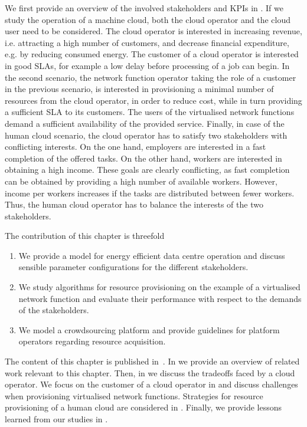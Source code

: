 We first provide an overview of the involved stakeholders and \glspl{KPI} in .
If we study the operation of a machine cloud, both the cloud operator and the cloud user need to be considered.
The cloud operator is interested in increasing revenue, i.e. attracting a high number of customers, and decrease financial expenditure, e.g. by reducing consumed energy.
The customer of a cloud operator is interested in good \glspl{SLA}, for example a low delay before processing of a job can begin.
In the second scenario, the network function operator taking the role of a customer in the previous scenario, is interested in provisioning a minimal number of resources from the cloud operator, in order to reduce cost, while in turn providing a sufficient \gls{SLA} to its customers.
The users of the virtualised network functions demand a sufficient availability of the provided service.
Finally, in case of the human cloud scenario, the cloud operator has to satisfy two stakeholders with conflicting interests.
On the one hand, employers are interested in a fast completion of the offered tasks.
On the other hand, workers are interested in obtaining a high income.
These goals are clearly conflicting, as fast completion can be obtained by providing a high number of available workers.
However, income per workers increases if the tasks are distributed between fewer workers.
Thus, the human cloud operator has to balance the interests of the two stakeholders.

The contribution of this chapter is threefold
\begin{enumerate}
\item We provide a model for energy efficient data centre operation and discuss sensible parameter configurations for the different stakeholders. 
\item We study algorithms for resource provisioning on the example of a virtualised network function and evaluate their performance with respect to the demands of the stakeholders.
\item We model a crowdsourcing platform and provide guidelines for platform operators regarding resource acquisition.
\end{enumerate}

The content of this chapter is published in~\cite{Schwartz2012a,Metzger2014a,Schwartz2015}.
In  we provide an overview of related work relevant to this chapter.
Then, in  we discuss the tradeoffs faced by a cloud operator.
We focus on the customer of a cloud operator in  and discuss challenges when provisioning virtualised network functions.
Strategies for resource provisioning of a human cloud are considered in .
Finally, we provide lessons learned from our studies in .





